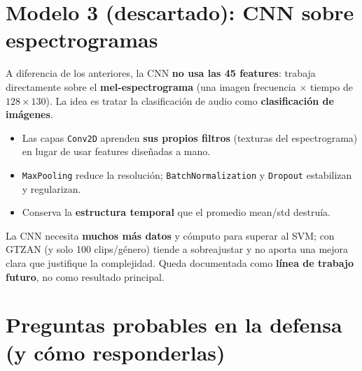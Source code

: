 \documentclass[11pt,a4paper]{article}
\newenvironment{defenbox}[1]{\begin{mdframed}[style=defenstyle,frametitle={#1}]}{\end{mdframed}}
\begin{document}
\section{Modelo 3 (descartado): CNN sobre espectrogramas}

A diferencia de los anteriores, la CNN \textbf{no usa las 45 features}: trabaja
directamente sobre el \textbf{mel-espectrograma} (una imagen
frecuencia $\times$ tiempo de $128 \times 130$). La idea es tratar la
clasificación de audio como \textbf{clasificación de imágenes}.

\begin{itemize}[leftmargin=0.7cm]
  \item Las capas \texttt{Conv2D} aprenden \textbf{sus propios filtros}
  (texturas del espectrograma) en lugar de usar features diseñadas a mano.
  \item \texttt{MaxPooling} reduce la resolución; \texttt{BatchNormalization} y
  \texttt{Dropout} estabilizan y regularizan.
  \item Conserva la \textbf{estructura temporal} que el promedio mean/std
  destruía.
\end{itemize}

\begin{defenbox}{Por qué se descartó (en principio)}
La CNN necesita \textbf{muchos más datos} y cómputo para superar al SVM; con
GTZAN (y solo 100 clips/género) tiende a sobreajustar y no aporta una mejora
clara que justifique la complejidad. Queda documentada como \textbf{línea de
trabajo futuro}, no como resultado principal.
\end{defenbox}

\section{Preguntas probables en la defensa (y cómo responderlas)}
\end{document}

